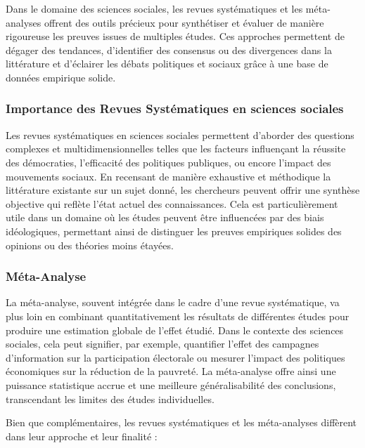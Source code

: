 \documentclass[
  letterpaper,
  DIV=11,
  numbers=noendperiod]{scrreprt}
\begin{document}
Dans le domaine des sciences sociales, les revues systématiques et les
méta-analyses offrent des outils précieux pour synthétiser et évaluer de
manière rigoureuse les preuves issues de multiples études. Ces approches
permettent de dégager des tendances, d'identifier des consensus ou des
divergences dans la littérature et d'éclairer les débats politiques et
sociaux grâce à une base de données empirique solide.

\subsubsection{Importance des Revues Systématiques en sciences
sociales}\label{importance-des-revues-systuxe9matiques-en-sciences-sociales}

Les revues systématiques en sciences sociales permettent d'aborder des
questions complexes et multidimensionnelles telles que les facteurs
influençant la réussite des démocraties, l'efficacité des politiques
publiques, ou encore l'impact des mouvements sociaux. En recensant de
manière exhaustive et méthodique la littérature existante sur un sujet
donné, les chercheurs peuvent offrir une synthèse objective qui reflète
l'état actuel des connaissances. Cela est particulièrement utile dans un
domaine où les études peuvent être influencées par des biais
idéologiques, permettant ainsi de distinguer les preuves empiriques
solides des opinions ou des théories moins étayées.

\subsubsection{Méta-Analyse}\label{muxe9ta-analyse}

La méta-analyse, souvent intégrée dans le cadre d'une revue
systématique, va plus loin en combinant quantitativement les résultats
de différentes études pour produire une estimation globale de l'effet
étudié. Dans le contexte des sciences sociales, cela peut signifier, par
exemple, quantifier l'effet des campagnes d'information sur la
participation électorale ou mesurer l'impact des politiques économiques
sur la réduction de la pauvreté. La méta-analyse offre ainsi une
puissance statistique accrue et une meilleure généralisabilité des
conclusions, transcendant les limites des études individuelles.

Bien que complémentaires, les revues systématiques et les méta-analyses
diffèrent dans leur approche et leur finalité :
\end{document}
